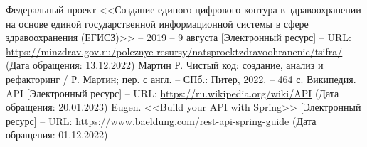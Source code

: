 \documentclass[a4paper,article]{article}
\begin{document}
    \newpage


    \begin{thebibliography}{}
         Федеральный проект <<Создание единого цифрового контура в здравоохранении на основе единой государственной информационной системы в сфере здравоохранения (ЕГИСЗ)>> -- 2019 -- 9 августа [Электронный ресурс] -- URL: \url{https://minzdrav.gov.ru/poleznye-resursy/natsproektzdravoohranenie/tsifra/} (Дата обращения: 13.12.2022)
         Мартин Р. Чистый код: создание, анализ и рефакторинг / Р. Мартин; пер. с англ. -- СПб.: Питер, 2022. -- 464 с.
         Википедия. API [Электронный ресурс] -- URL: \url{https://ru.wikipedia.org/wiki/API} (Дата обращения: 20.01.2023)
         Eugen. <<Build your API with Spring>> [Электронный ресурс] -- URL: \url{https://www.baeldung.com/rest-api-spring-guide} (Дата обращения: 01.12.2022)
    \end{thebibliography}
\end{document}
